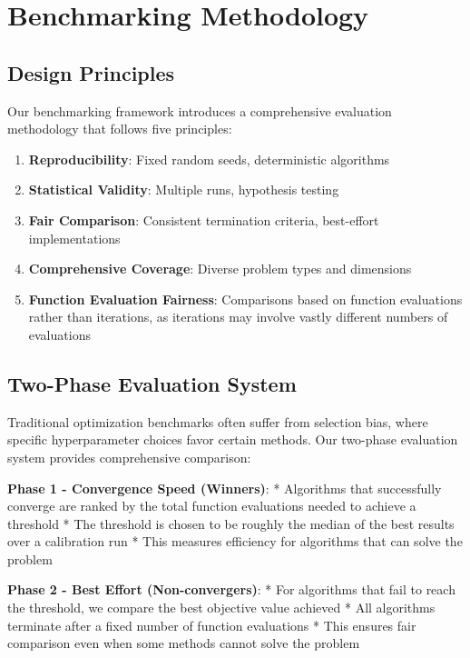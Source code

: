 \hypertarget{benchmarking-methodology}{%
\section{Benchmarking Methodology}\label{benchmarking-methodology}}

\hypertarget{design-principles}{%
\subsection{Design Principles}\label{design-principles}}

Our benchmarking framework introduces a comprehensive evaluation methodology that follows five principles:

\begin{enumerate}
\def\labelenumi{\arabic{enumi}.}
\tightlist
\item
  \textbf{Reproducibility}: Fixed random seeds, deterministic algorithms
\item
  \textbf{Statistical Validity}: Multiple runs, hypothesis testing
\item
  \textbf{Fair Comparison}: Consistent termination criteria, best-effort implementations
\item
  \textbf{Comprehensive Coverage}: Diverse problem types and dimensions
\item
  \textbf{Function Evaluation Fairness}: Comparisons based on function evaluations rather than iterations, as iterations may involve vastly different numbers of evaluations
\end{enumerate}

\hypertarget{two-phase-evaluation-system}{%
\subsection{Two-Phase Evaluation System}\label{two-phase-evaluation-system}}

Traditional optimization benchmarks often suffer from selection bias, where specific hyperparameter choices favor certain methods. Our two-phase evaluation system provides comprehensive comparison:

\textbf{Phase 1 - Convergence Speed (Winners)}:
* Algorithms that successfully converge are ranked by the total function evaluations needed to achieve a threshold
* The threshold is chosen to be roughly the median of the best results over a calibration run
* This measures efficiency for algorithms that can solve the problem

\textbf{Phase 2 - Best Effort (Non-convergers)}:
* For algorithms that fail to reach the threshold, we compare the best objective value achieved
* All algorithms terminate after a fixed number of function evaluations
* This ensures fair comparison even when some methods cannot solve the problem

